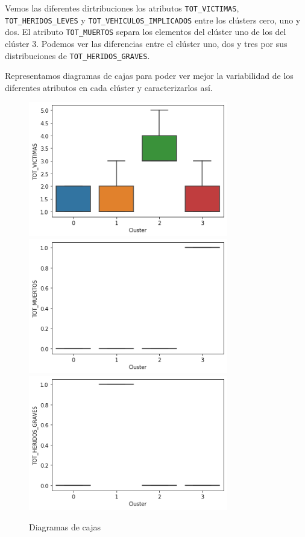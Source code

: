 \documentclass[a4]{article}
\begin{document}
Vemos las diferentes dirtribuciones los atributos \texttt{TOT\_VICTIMAS}, \texttt{TOT\_HERIDOS\_LEVES} y \texttt{TOT\_VEHICULOS\_IMPLICADOS} entre los clústers cero, uno y dos. El atributo \texttt{TOT\_MUERTOS} separa los elementos del clúster uno de los del clúster 3. Podemos ver las diferencias entre el clúster uno, dos y tres por sus distribuciones de \texttt{TOT\_HERIDOS\_GRAVES}.

Representamos diagramas de cajas para poder ver mejor la variabilidad de los diferentes atributos en cada clúster y caracterizarlos así.

\begin{figure}[H]
  \centering
  \caption{Diagramas de cajas}
  \includegraphics[width=87mm]{imagenes/c3_kmeans_vic}
  \includegraphics[width=87mm]{imagenes/c3_kmeans_muertos}
  \includegraphics[width=87mm]{imagenes/c3_kmeans_hg}

\end{figure}
\end{document}
